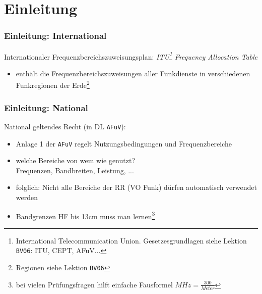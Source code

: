 

\subtitle{Betriebstechnik/Vorschriften 09: \\
          Betriebsarten, Sendearten, Frequenzen \\[2em]}
\date{Stand 21.01.2016}



\section{Einleitung}

\begin{frame}
    \frametitle{Einleitung: International}

    Internationaler Frequenzbereichszuweisungsplan:
    \emph{ITU\footnote{International Telecommunication Union.
    Gesetzesgrundlagen siehe Lektion \texttt{BV06}: ITU, CEPT, AFuV...} Frequency
    Allocation Table}

    \begin{itemize}
        \item enthält die Frequenzbereichszuweisungen aller Funkdienste in
              verschiedenen Funkregionen der Erde\footnote{Regionen siehe Lektion \texttt{BV06}}
    \end{itemize}

\end{frame}

\begin{frame}
    \frametitle{Einleitung: National}

    National geltendes Recht (in DL \texttt{AFuV}):

    \begin{itemize}
        \item Anlage 1 der \texttt{AFuV} regelt Nutzungsbedingungen und Frequenzbereiche
        \item welche Bereiche von wem wie genutzt? \\
              Frequenzen, Bandbreiten, Leistung, ...
        \item folglich: Nicht alle Bereiche der RR (VO Funk) dürfen automatisch
              verwendet werden
        \item Bandgrenzen HF bis 13cm muss man lernen\footnote{bei vielen
              Prüfungsfragen hilft einfache Fausformel $MHz = \frac{300}{Meter}$}
    \end{itemize}

\end{frame}

